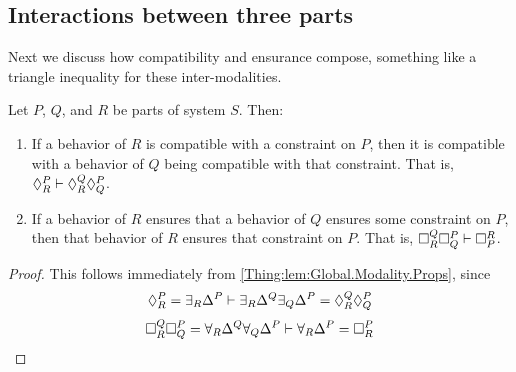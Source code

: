 \subsection{Interactions between three parts}
    Next we discuss how compatibility and ensurance compose, something like a triangle inequality for these inter-modalities.
    \begin{prop}[Composition]
    Let $P$, $Q$, and $R$ be parts of system $S$. Then:
    \begin{enumerate}
        \item If a behavior of $R$ is compatible with a constraint on $P$, then it is compatible with a behavior of $Q$ being compatible with that constraint. That is, $\compat{P}{R} \vdash \compat{Q}
        {R}  \compat{P}{Q}$.
        \item If a behavior of $R$ ensures that a behavior of $Q$ ensures some constraint on $P$, then that behavior of $R$ ensures that constraint on $P$. That is, $\ensure{Q}{R}\ensure{P}{Q} \vdash \ensure{R}{P}$.
    \end{enumerate}
    \end{prop}
    \begin{proof}
    This follows immediately from \cref{Thing:lem:Global.Modality.Props}, since 
    \[
    \compat{P}{R} = \exists_R \Delta^P \vdash \exists_R \Delta^Q \exists_Q \Delta^P = \compat{Q}{R}\compat{P}{Q}
    \]
    \[
    \ensure{Q}{R}\ensure{P}{Q} = \forall_R \Delta^Q \forall_Q \Delta^P \vdash \forall_R \Delta^P = \ensure{P}{R} \qedhere
    \]
    \end{proof}
    

